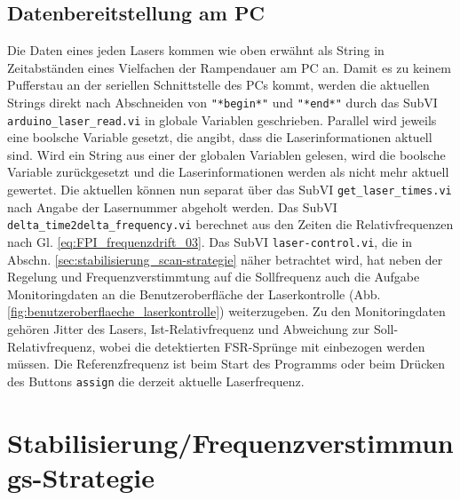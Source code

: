 \subsection{Datenbereitstellung am PC}\label{subsec:datenbereitstellung}
Die Daten eines jeden Lasers kommen wie oben erwähnt als String in Zeitabständen
eines Vielfachen der Rampendauer am PC an. Damit es zu keinem Pufferstau an
der seriellen Schnittstelle des PCs kommt, werden die aktuellen Strings direkt
nach Abschneiden von \lstinline|"*begin*"| und \lstinline|"*end*"| durch das
SubVI \lstinline|arduino_laser_read.vi| in globale Variablen geschrieben.
Parallel wird jeweils eine boolsche Variable gesetzt, die angibt, dass die Laserinformationen aktuell sind. Wird ein String aus einer der
globalen Variablen gelesen, wird die boolsche Variable zurückgesetzt und die
Laserinformationen werden als nicht mehr aktuell gewertet. Die aktuellen können
nun separat über das SubVI \lstinline|get_laser_times.vi| nach Angabe der
Lasernummer abgeholt werden. Das SubVI \lstinline|delta_time2delta_frequency.vi|
berechnet aus den Zeiten die Relativfrequenzen nach Gl.
\eqref{eq:FPI_frequenzdrift_03}. Das SubVI \lstinline|laser-control.vi|, die in
Abschn. \ref{sec:stabilisierung_scan-strategie} näher betrachtet wird, hat neben
der Regelung und Frequenzverstimmtung auf die Sollfrequenz auch die Aufgabe
Monitoringdaten an die Benutzeroberfläche der Laserkontrolle (Abb.
\ref{fig:benutzeroberflaeche_laserkontrolle}) weiterzugeben. Zu den
Monitoringdaten gehören Jitter des Lasers, Ist-Relativfrequenz und Abweichung
zur Soll-Relativfrequenz, wobei die detektierten FSR-Sprünge mit einbezogen
werden müssen. Die Referenzfrequenz ist beim Start des Programms oder beim
Drücken des Buttons \lstinline|assign| die derzeit aktuelle Laserfrequenz.

\section{Stabilisierung/Frequenzverstimmungs-Strategie}\label{sec:stabilisierung_frequenzverstimmungs-strategie}
